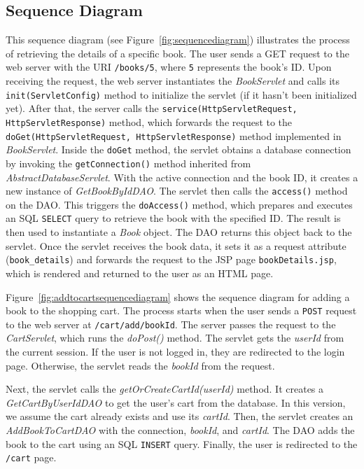 \subsection{Sequence Diagram}

This sequence diagram (see Figure~\ref{fig:sequencediagram}) illustrates the process of retrieving the details of a specific book.
The user sends a GET request to the web server with the URI \texttt{/books/5}, where \texttt{5} represents the book's ID. Upon receiving the request, the web server instantiates the \textit{BookServlet} and calls its \texttt{init(ServletConfig)} method to initialize the servlet (if it hasn't been initialized yet). After that, the server calls the \texttt{service(HttpServletRequest, HttpServletResponse)} method, which forwards the request to the \texttt{doGet(HttpServletRequest, HttpServletResponse)} method implemented in \textit{BookServlet}.
Inside the \texttt{doGet} method, the servlet obtains a database connection by invoking the \texttt{getConnection()} method inherited from \textit{AbstractDatabaseServlet}. With the active connection and the book ID, it creates a new instance of \textit{GetBookByIdDAO}.
The servlet then calls the \texttt{access()} method on the DAO. This triggers the \texttt{doAccess()} method, which prepares and executes an SQL \texttt{SELECT} query to retrieve the book with the specified ID. The result is then used to instantiate a \textit{Book} object. The DAO returns this object back to the servlet.
Once the servlet receives the book data, it sets it as a request attribute (\verb|book_details|) and forwards the request to the JSP page \texttt{bookDetails.jsp}, which is rendered and returned to the user as an HTML page.
\bigskip

Figure~\ref{fig:addtocartsequencediagram} shows the sequence diagram for adding a book to the shopping cart. The process starts when the user sends a \texttt{POST} request to the web server at \texttt{/cart/add/{bookId}}. The server passes the request to the \textit{CartServlet}, which runs the \textit{doPost()} method. The servlet gets the \textit{userId} from the current session. If the user is not logged in, they are redirected to the login page. Otherwise, the servlet reads the \textit{bookId} from the request.

Next, the servlet calls the \textit{getOrCreateCartId(userId)} method. It creates a \textit{GetCartByUserIdDAO} to get the user's cart from the database. In this version, we assume the cart already exists and use its \textit{cartId}. Then, the servlet creates an \textit{AddBookToCartDAO} with the connection, \textit{bookId}, and \textit{cartId}. The DAO adds the book to the cart using an SQL \texttt{INSERT} query. Finally, the user is redirected to the \texttt{/cart} page.
\bigskip

